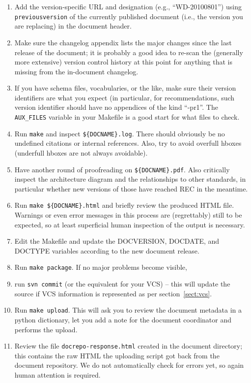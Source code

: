 \documentclass[11pt,a4paper]{ivoa}
\newcommand{\texword}[1]{\texttt{\color{texcolor} #1}}
\begin{document}
\begin{enumerate}
\item Add the version-specific URL and designation (e.g.,
``WD-20100801'') using \texword{previousversion} of the currently
published document (i.e., the version you are replacing) in the document
header.
\item Make sure the changelog appendix lists the major changes since the
last release of the document; it is probably a good idea to re-scan the
(generally more extensive) version control history at this point for
anything that is missing from the in-document changelog.
\item If you have schema files, vocabularies, or the like, make sure
their version identifiers are what you expect (in particular, for
recommendations, such version identifier should have no appendices
of the kind ``-pr1''.  The \verb|AUX_FILES| variable in your Makefile is
a good start for what files to check.
\item Run \verb|make| and inspect \verb|${DOCNAME}.log|.  There should
obviously be no undefined citations or internal references.  Also, try
to avoid overfull hboxes (underfull hboxes are not always avoidable).
\item Have another round of proofreading on \verb|${DOCNAME}.pdf|.  Also
critically inspect the architecture diagram and the relationships to
other standards, in particular whether new versions of those have
reached REC in the meantime.
\item Run \verb|make ${DOCNAME}.html| and briefly review the produced
HTML file.  Warnings or even error messages in this process are
(regrettably) still to be expected, so at least superficial human inspection 
of the output is necessary.
\item Edit the Makefile and update the DOCVERSION, DOCDATE, and DOCTYPE
variables according to the new document release.
\item Run \verb|make package|.  If no major problems become visible,
\item run \verb|svn commit| (or the equivalent for your VCS) -- this
will update the source if VCS information is represented as per
section~\ref{sect:vcs}.
\item Run \verb|make upload|.  This will ask you to review the document
metadata in a python dictionary, let you add a note for the document
coordinator and performs the upload.
\item Review the file \texttt{docrepo-response.html} created in the
document directory; this contains the raw HTML the uploading script got
back from the document repository.  We do not automatically check for
errors yet, so again human attention is required.
\end{enumerate}
\end{document}
